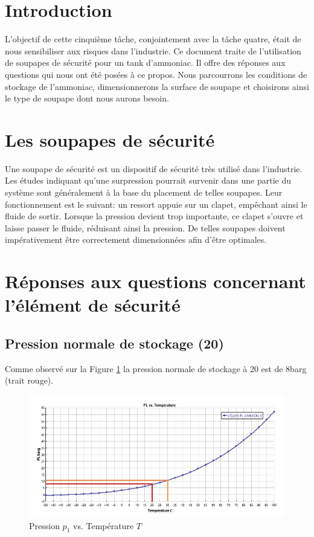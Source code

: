 \section {Introduction}

L'objectif de cette cinquième tâche, conjointement avec la tâche quatre, était de nous sensibiliser aux risques dans l'industrie. Ce document traite de l'utilisation de soupapes de sécurité pour un tank d'ammoniac. Il offre des réponses aux questions qui nous ont été posées à ce propos. Nous parcourrons les conditions de stockage de l'ammoniac, dimensionnerons la surface de soupape et choisirons ainsi le type de soupape dont nous aurons besoin.

\section{Les soupapes de sécurité}
Une soupape de sécurité est un dispositif de sécurité très utilisé dans l'industrie. Les études  indiquant qu'une surpression pourrait survenir dans une partie du système sont généralement à la base du placement de telles soupapes. Leur fonctionnement est le suivant: un ressort appuie sur un clapet, empêchant ainsi le fluide de sortir. Lorsque la pression devient trop importante, ce clapet s'ouvre et laisse passer le fluide, réduisant ainsi la pression. De telles soupapes doivent impérativement être correctement dimensionnées afin d'être optimales.

\section{Réponses aux questions concernant l'élément de sécurité}
\subsection{Pression normale de stockage (\unit{20}{\celsius})}

Comme observé sur la Figure \ref{graph1} la pression normale de stockage à \unit{20}{\celsius} est de \unit{8}{barg} (trait rouge).

\begin{figure}[ht!]
\centering
\includegraphics[scale=0.4]{tache5.jpg}
\caption{Pression $p_1$ vs. Température $T$}
\label{graph1}
\end{figure}

